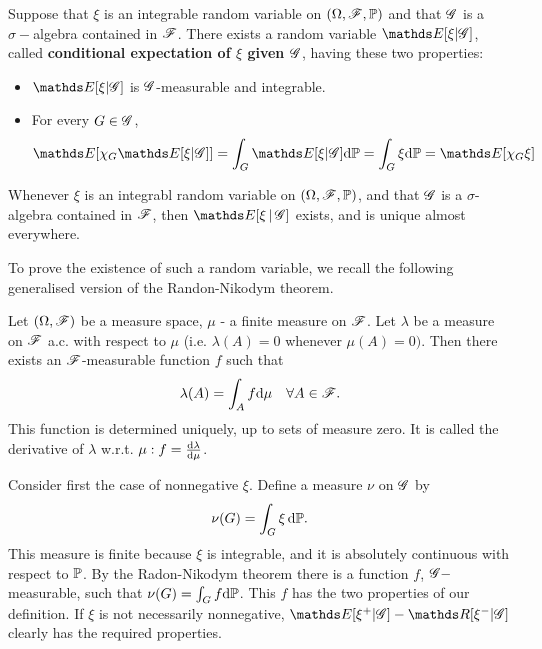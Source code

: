 \begin{definition} \label{def:conditional_expectation}
Suppose that $\xi$ is an integrable random variable on $(\Omega, \mathcal{F}, \mathbb{P})$ and that $\mathcal{G}$ is a $\sigma-$algebra contained in $\mathcal{F}$. There exists a random variable $\E[\xi | \G]$, called \textbf{conditional expectation of $\xi$ given $\mathcal{G}$}, having these two properties:
\begin{itemize}
    \item $\E[\xi | \G]$ is $\mathcal{G}$-measurable and integrable.
    \item For every $G \in \mathcal{G}$,
    \begin{equation} \label{eq:condtional_expectation}
        \E[\chi_G \E[\xi | \G]] = \int_G \E[\xi | \G] \d \p = \int_G \xi \d \p = \E[\chi_G \xi]
    \end{equation}
\end{itemize}
\end{definition}

\begin{theorem} Whenever $\xi$ is an integrabl random variable on $(\Omega, \mathcal{F}, \mathbb{P})$, and that $\mathcal{G}$ is a $\sigma$-algebra contained in $\mathcal{F}$, then $\E[\xi \,|\, \G]$ exists, and is unique almost everywhere.
\end{theorem}

To prove the existence of such a random variable, we recall the following generalised version of the Randon-Nikodym theorem.

\begin{theorem}
Let $(\Omega, \mathcal{F})$ be a measure space, $\mu$ - a finite measure on $\mathcal{F}$. Let $\lambda$ be a measure on $\mathcal{F}$ a.c. with respect to $\mu$ (i.e. $\lambda (A) = 0$ whenever $\mu(A)=0)$. Then there exists an $\mathcal{F}$-measurable function $f$ such that 
\begin{equation}
    \lambda(A) = \int_A f \mathrm{d} \mu \quad \forall A \in \mathcal{F}.
\end{equation}
This function is determined uniquely, up to sets of measure zero. It is called the derivative of $\lambda$ w.r.t. $\mu: f = \frac{\mathrm{d} \lambda}{\mathrm{d} \mu}$. 
\end{theorem}

Consider first the case of nonnegative $\xi$. Define a measure $\nu$ on $\mathcal{G}$ by
\begin{equation*}
    \nu(G) = \int_G \xi \, \mathrm{d} \mathbb{P}.
\end{equation*}
This measure is finite because $\xi$ is integrable, and it is absolutely continuous with respect to $\mathbb{P}$. By the Radon-Nikodym theorem there is a function $f$, $\mathcal{G}-$measurable, such that $\nu(G) = \int_G f \mathrm{d} \mathbb{P}$. This $f$ has the two properties of our definition. If $\xi$ is not necessarily nonnegative, $\E[\xi^+ | \G] - \R[\xi^- | \G]$ clearly has the required properties. \\

